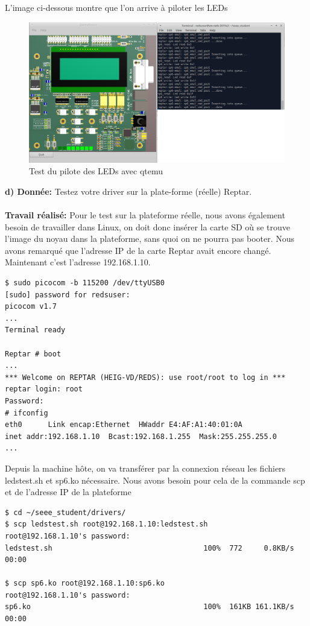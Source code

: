 L'image ci-dessous montre que l'on arrive à piloter les LEDs
\begin{figure}[H]
	\begin{center}
		\includegraphics[width=17cm]{img/driverLeds.png}
		\caption{Test du pilote des LEDs avec qtemu}
		\label{driverLed3}
	\end{center}
\end{figure}
\textbf{d) Donnée: }Testez votre driver sur la plate-forme (réelle) Reptar.\\\\
\textbf{Travail réalisé: }Pour le test sur la plateforme réelle, nous avons également besoin de travailler dans Linux, on doit donc insérer la carte SD où se trouve l'image du noyau dans la plateforme, sans quoi on ne pourra pas booter. Nous avons remarqué que l'adresse IP de la carte Reptar avait encore changé. Maintenant c'est l'adresse 192.168.1.10.
\begin{lstlisting}
$ sudo picocom -b 115200 /dev/ttyUSB0 
[sudo] password for redsuser: 
picocom v1.7
...
Terminal ready

Reptar # boot
...
*** Welcome on REPTAR (HEIG-VD/REDS): use root/root to log in ***
reptar login: root
Password: 
# ifconfig
eth0      Link encap:Ethernet  HWaddr E4:AF:A1:40:01:0A  
inet addr:192.168.1.10  Bcast:192.168.1.255  Mask:255.255.255.0
...
\end{lstlisting}
Depuis la machine hôte, on va transférer par la connexion réseau les fichiers ledstest.sh et sp6.ko nécessaire. Nous avons besoin pour cela de la commande scp et de l'adresse IP de la plateforme
\begin{lstlisting}
$ cd ~/seee_student/drivers/
$ scp ledstest.sh root@192.168.1.10:ledstest.sh
root@192.168.1.10's password: 
ledstest.sh                                   100%  772     0.8KB/s   00:00  
  
$ scp sp6.ko root@192.168.1.10:sp6.ko
root@192.168.1.10's password: 
sp6.ko                                        100%  161KB 161.1KB/s   00:00    
\end{lstlisting}

